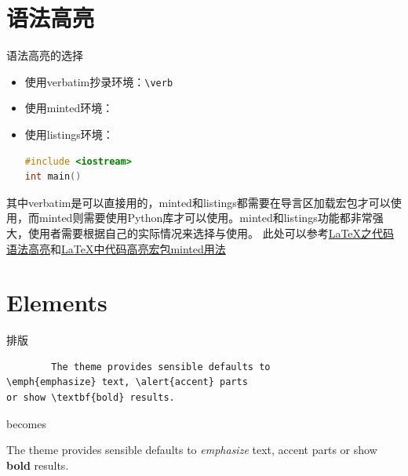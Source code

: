 \documentclass[8pt,UTF8]{ctexbeamer}
\begin{document}
\section{语法高亮}
\begin{frame}[fragile]{语法高亮的选择}
	\begin{itemize}
		\item 使用verbatim抄录环境：\verb|\verb|
		
		\item 使用minted环境：
		
		\item 使用listings环境：
		\begin{lstlisting}[language=c++]
#include <iostream>
int main()
		\end{lstlisting}
	\end{itemize}
其中verbatim是可以直接用的，minted和listings都需要在导言区加载宏包才可以使用，而minted则需要使用Python库才可以使用。minted和listings功能都非常强大，使用者需要根据自己的实际情况来选择与使用。
此处可以参考\href{https://www.latexstudio.net/archives/5900.html}{LaTeX之代码语法高亮}和\href{https://blog.csdn.net/xenonhu/article/details/88978672}{LaTeX中代码高亮宏包minted用法}
\end{frame}

\section{Elements}

\begin{frame}[fragile]{排版}
      \begin{verbatim}
      	The theme provides sensible defaults to
\emph{emphasize} text, \alert{accent} parts
or show \textbf{bold} results.
\end{verbatim}

  \begin{center}
  	becomes
  \end{center}

  The theme provides sensible defaults to \emph{emphasize} text,
  \alert{accent} parts or show \textbf{bold} results.
\end{frame}
\end{document}
